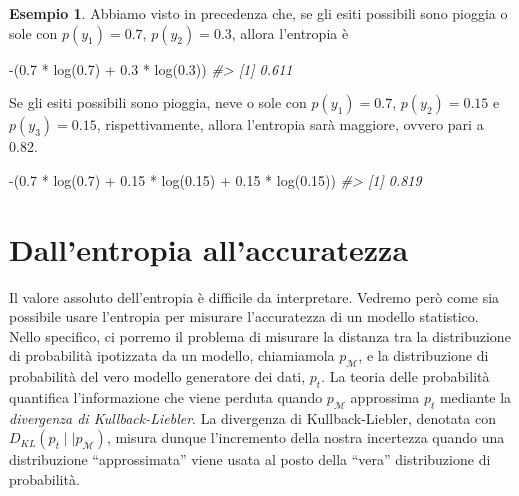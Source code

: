 \documentclass[
  10pt,
  italian,
  a4paper,
  extrafontsizes,onecolumn,openright
  ]{memoir}
\newenvironment{Shaded}{\begin{snugshade}}{\end{snugshade}}
\newcommand{\CommentTok}[1]{\textcolor[rgb]{0.56,0.35,0.01}{\textit{#1}}}
\newcommand{\FloatTok}[1]{\textcolor[rgb]{0.00,0.00,0.81}{#1}}
\newcommand{\FunctionTok}[1]{\textcolor[rgb]{0.00,0.00,0.00}{#1}}
\newcommand{\NormalTok}[1]{#1}
\newcommand{\SpecialCharTok}[1]{\textcolor[rgb]{0.00,0.00,0.00}{#1}}
\theoremstyle{definition}
\theoremstyle{definition}
\newtheorem{example}{Esempio}[chapter]
\theoremstyle{definition}
\theoremstyle{definition}
\theoremstyle{remark}
\begin{document}
\begin{example}

Abbiamo visto in precedenza che, se gli esiti possibili sono pioggia o sole con \(p(y_1) = 0.7\), \(p(y_2) = 0.3\), allora l'entropia è

\begin{Shaded}
\begin{Highlighting}[]
\SpecialCharTok{{-}}\NormalTok{(}\FloatTok{0.7} \SpecialCharTok{*} \FunctionTok{log}\NormalTok{(}\FloatTok{0.7}\NormalTok{) }\SpecialCharTok{+} \FloatTok{0.3} \SpecialCharTok{*} \FunctionTok{log}\NormalTok{(}\FloatTok{0.3}\NormalTok{))}
\CommentTok{\#\textgreater{} [1] 0.611}
\end{Highlighting}
\end{Shaded}

\noindent
Se gli esiti possibili sono pioggia, neve o sole con \(p(y_1) = 0.7\), \(p(y_2) = 0.15\) e \(p(y_3) = 0.15\), rispettivamente, allora l'entropia sarà maggiore, ovvero pari a 0.82.

\begin{Shaded}
\begin{Highlighting}[]
\SpecialCharTok{{-}}\NormalTok{(}\FloatTok{0.7} \SpecialCharTok{*} \FunctionTok{log}\NormalTok{(}\FloatTok{0.7}\NormalTok{) }\SpecialCharTok{+} \FloatTok{0.15} \SpecialCharTok{*} \FunctionTok{log}\NormalTok{(}\FloatTok{0.15}\NormalTok{) }\SpecialCharTok{+} \FloatTok{0.15} \SpecialCharTok{*} \FunctionTok{log}\NormalTok{(}\FloatTok{0.15}\NormalTok{))}
\CommentTok{\#\textgreater{} [1] 0.819}
\end{Highlighting}
\end{Shaded}

\end{example}

\hypertarget{dallentropia-allaccuratezza}{%
\section{Dall'entropia all'accuratezza}\label{dallentropia-allaccuratezza}}

Il valore assoluto dell'entropia è difficile da interpretare. Vedremo però come sia possibile usare l'entropia per misurare l'accuratezza di un modello statistico. Nello specifico, ci porremo il problema di misurare la distanza tra la distribuzione di probabilità ipotizzata da un modello, chiamiamola \(p_{\mathcal{M}}\), e la distribuzione di probabilità del vero modello generatore dei dati, \(p_t\). La teoria delle probabilità quantifica l'informazione che viene perduta quando \(p_{\mathcal{M}}\) approssima \(p_t\) mediante la \emph{divergenza di Kullback-Liebler}. La divergenza di Kullback-Liebler, denotata con \(D_{KL}(p_t \mid\mid p_{\mathcal{M}})\), misura dunque l'incremento della nostra incertezza quando una distribuzione ``approssimata'' viene usata al posto della ``vera'' distribuzione di probabilità.
\end{document}
